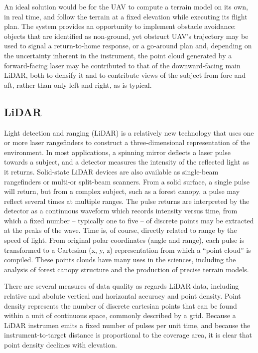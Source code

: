 \documentclass[10pt,a4paper]{report}
\begin{document}
An ideal solution would be for the UAV to compute a terrain model on its own, in real time, and follow the terrain at a fixed elevation while executing its flight plan. The system provides an opportunity to implement obstacle avoidance: objects that are identified as non-ground, yet obstruct UAV’s trajectory may be used to signal a return-to-home response, or a go-around plan and, depending on the uncertainty inherent in the instrument, the point cloud generated by a forward-facing laser may be contributed to that of the downward-facing main LiDAR, both to densify it and to contribute views of the subject from fore and aft, rather than only left and right, as is typical. 

\subsection{LiDAR}

Light detection and ranging (LiDAR) is a relatively new technology that uses one or more laser rangefinders to construct a three-dimensional representation of the environment. In most applications, a spinning mirror deflects a laser pulse towards a subject, and a detector measures the intensity of the reflected light as it returns. Solid-state LiDAR devices are also available as single-beam rangefinders or multi-or split-beam scanners. From a solid surface, a single pulse will return, but from a complex subject, such as a forest canopy, a pulse may reflect several times at multiple ranges. The pulse returns are interpreted by the detector as a continuous waveform which records intensity versus time, from which a fixed number -- typically one to five -- of discrete points may be extracted at the peaks of the wave. Time is, of course, directly related to range by the speed of light. From original polar coordinates (angle and range), each pulse is transformed to a Cartesian (x, y, z) representation from which a “point cloud” is compiled. These points clouds have many uses in the sciences, including the analysis of forest canopy structure and the production of precise terrain models. 

There are several measures of data quality as regards LiDAR data, including relative and abolute vertical and horizontal accuracy and point density. Point density represents the number of discrete cartesian points that can be found within a unit of continuous space, commonly described by a grid. Because a LiDAR instrumen emits a fixed number of pulses per unit time, and because the instrument-to-target distance is proportional to the coverage area, it is clear that point density declines with elevation. 
\end{document}
